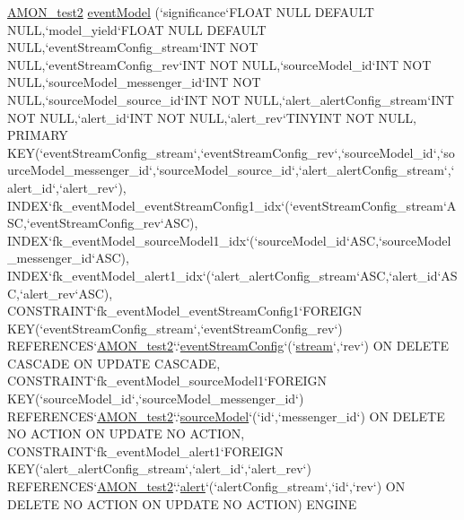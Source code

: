\begin{DoxyCompactItemize}
\hyperlink{db__mc__build_8sql_a19c21c59303d8b6591b92240ff7de1d5}{A\-M\-O\-N\-\_\-test2} \hyperlink{db__mc__build_8sql_a104ea108c5a53c31b9ed7534e52fbb0d}{event\-Model} (`significance`F\-L\-O\-A\-T N\-U\-L\-L D\-E\-F\-A\-U\-L\-T N\-U\-L\-L,`model\-\_\-yield`F\-L\-O\-A\-T N\-U\-L\-L D\-E\-F\-A\-U\-L\-T N\-U\-L\-L,`event\-Stream\-Config\-\_\-stream`I\-N\-T N\-O\-T N\-U\-L\-L,`event\-Stream\-Config\-\_\-rev`I\-N\-T N\-O\-T N\-U\-L\-L,`source\-Model\-\_\-id`I\-N\-T N\-O\-T N\-U\-L\-L,`source\-Model\-\_\-messenger\-\_\-id`I\-N\-T N\-O\-T N\-U\-L\-L,`source\-Model\-\_\-source\-\_\-id`I\-N\-T N\-O\-T N\-U\-L\-L,`alert\-\_\-alert\-Config\-\_\-stream`I\-N\-T N\-O\-T N\-U\-L\-L,`alert\-\_\-id`I\-N\-T N\-O\-T N\-U\-L\-L,`alert\-\_\-rev`T\-I\-N\-Y\-I\-N\-T N\-O\-T N\-U\-L\-L, P\-R\-I\-M\-A\-R\-Y K\-E\-Y(`event\-Stream\-Config\-\_\-stream`,`event\-Stream\-Config\-\_\-rev`,`source\-Model\-\_\-id`,`source\-Model\-\_\-messenger\-\_\-id`,`source\-Model\-\_\-source\-\_\-id`,`alert\-\_\-alert\-Config\-\_\-stream`,`alert\-\_\-id`,`alert\-\_\-rev`), I\-N\-D\-E\-X`fk\-\_\-event\-Model\-\_\-event\-Stream\-Config1\-\_\-idx`(`event\-Stream\-Config\-\_\-stream`A\-S\-C,`event\-Stream\-Config\-\_\-rev`A\-S\-C), I\-N\-D\-E\-X`fk\-\_\-event\-Model\-\_\-source\-Model1\-\_\-idx`(`source\-Model\-\_\-id`A\-S\-C,`source\-Model\-\_\-messenger\-\_\-id`A\-S\-C), I\-N\-D\-E\-X`fk\-\_\-event\-Model\-\_\-alert1\-\_\-idx`(`alert\-\_\-alert\-Config\-\_\-stream`A\-S\-C,`alert\-\_\-id`A\-S\-C,`alert\-\_\-rev`A\-S\-C), C\-O\-N\-S\-T\-R\-A\-I\-N\-T`fk\-\_\-event\-Model\-\_\-event\-Stream\-Config1`F\-O\-R\-E\-I\-G\-N K\-E\-Y(`event\-Stream\-Config\-\_\-stream`,`event\-Stream\-Config\-\_\-rev`) R\-E\-F\-E\-R\-E\-N\-C\-E\-S`\hyperlink{db__mc__build_8sql_a19c21c59303d8b6591b92240ff7de1d5}{A\-M\-O\-N\-\_\-test2}`.`\hyperlink{db__mc__build_8sql_a2932d2685911e3e53938c3498b7f53b9}{event\-Stream\-Config}`(`\hyperlink{db__mc__build_8sql_a67b7e9fc922cbf49b5ae3124240f4188}{stream}`,`rev`) O\-N D\-E\-L\-E\-T\-E C\-A\-S\-C\-A\-D\-E O\-N U\-P\-D\-A\-T\-E C\-A\-S\-C\-A\-D\-E, C\-O\-N\-S\-T\-R\-A\-I\-N\-T`fk\-\_\-event\-Model\-\_\-source\-Model1`F\-O\-R\-E\-I\-G\-N K\-E\-Y(`source\-Model\-\_\-id`,`source\-Model\-\_\-messenger\-\_\-id`) R\-E\-F\-E\-R\-E\-N\-C\-E\-S`\hyperlink{db__mc__build_8sql_a19c21c59303d8b6591b92240ff7de1d5}{A\-M\-O\-N\-\_\-test2}`.`\hyperlink{db__mc__build_8sql_a623797c037cb18b880ed6982ebd22fc4}{source\-Model}`(`id`,`messenger\-\_\-id`) O\-N D\-E\-L\-E\-T\-E N\-O A\-C\-T\-I\-O\-N O\-N U\-P\-D\-A\-T\-E N\-O A\-C\-T\-I\-O\-N, C\-O\-N\-S\-T\-R\-A\-I\-N\-T`fk\-\_\-event\-Model\-\_\-alert1`F\-O\-R\-E\-I\-G\-N K\-E\-Y(`alert\-\_\-alert\-Config\-\_\-stream`,`alert\-\_\-id`,`alert\-\_\-rev`) R\-E\-F\-E\-R\-E\-N\-C\-E\-S`\hyperlink{db__mc__build_8sql_a19c21c59303d8b6591b92240ff7de1d5}{A\-M\-O\-N\-\_\-test2}`.`\hyperlink{db__mc__build_8sql_a38a604686c7d372f50752e893e3e1e21}{alert}`(`alert\-Config\-\_\-stream`,`id`,`rev`) O\-N D\-E\-L\-E\-T\-E N\-O A\-C\-T\-I\-O\-N O\-N U\-P\-D\-A\-T\-E N\-O A\-C\-T\-I\-O\-N) E\-N\-G\-I\-N\-E

\end{DoxyCompactItemize}
